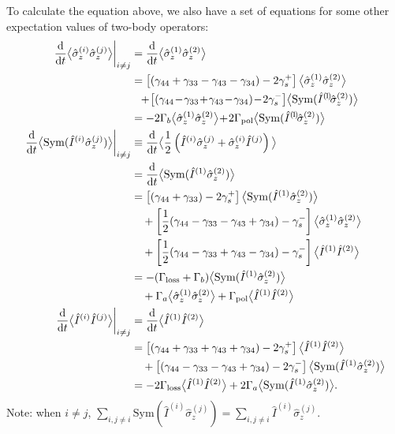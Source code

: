 To calculate the equation above, we also have a set of equations for some other expectation values of two-body operators:
\begin{align}
\left.\dt{}\expect{\hat{\sigma}_z^{(i)} \hat{\sigma}_z^{(j)}}\right|_{i\neq j} &= \dt{}\expect{\hat{\sigma}_z^{(1)} \hat{\sigma}_z^{(2)}}\\
&= \left[ (\gamma_{44}+\gamma_{33}-\gamma_{43}-\gamma_{34})  -2\gamma_s^+\right]\expect{\hat{\sigma}_z^{(1)} \hat{\sigma}_z^{(2)}}\nonumber\\
&\quad \!\!+\! \left[ (\gamma_{44}\!-\!\gamma_{33}\!+\!\gamma_{43}\!-\!\gamma_{34})  \!-\! 2\gamma_s^-\right]\! \expect{\mathrm{Sym}(\hat{I}^{(\!1\!)}\!\hat{\sigma}_z^{(2)} )}\\
&=-2\Gamma_b \expect{\hat{\sigma}_z^{(1)} \hat{\sigma}_z^{(2)}} \!+\! 2\Gamma_{\rm pol} \expect{\mathrm{Sym}(\hat{I}^{(\!1\!)}\!\hat{\sigma}_z^{(2)} )}\\
\left.\dt{}\expect{\mathrm{Sym}(\hat{I}^{(i)}\hat{\sigma}_z^{(j)} ) }\right|_{i\neq j} &\equiv \dt{}\expect{\frac{1}{2}\left( \hat{I}^{(i)}\hat{\sigma}_z^{(j)}+\hat{\sigma}_z^{(i)}\hat{I}^{(j)} \right) }\\
&= \dt{}\expect{\mathrm{Sym}( \hat{I}^{(1)}\hat{\sigma}_z^{(2)} ) }\\
&= \left[(\gamma_{44}+\gamma_{33})-2\gamma_s^+ \right] \expect{\mathrm{Sym}( \hat{I}^{(1)}\hat{\sigma}_z^{(2)} ) }\nonumber\\
&\quad + \left[ \frac{1}{2}(\gamma_{44}-\gamma_{33}-\gamma_{43}+\gamma_{34})  -\gamma_s^-\right]\expect{\hat{\sigma}_z^{(1)} \hat{\sigma}_z^{(2)}} \nonumber\\
&\quad + \left[ \frac{1}{2}(\gamma_{44}-\gamma_{33}+\gamma_{43}-\gamma_{34})  -\gamma_s^-\right]\expect{\hat{I}^{(1)} \hat{I}^{(2)}}\\
&= -(\Gamma_{\rm loss}+\Gamma_b )\expect{\mathrm{Sym}( \hat{I}^{(1)}\hat{\sigma}_z^{(2)} ) } \nonumber\\
&\quad +\Gamma_a \expect{\hat{\sigma}_z^{(1)} \hat{\sigma}_z^{(2)}} + \Gamma_{\rm pol}\expect{\hat{I}^{(1)} \hat{I}^{(2)}}\\
\left.\dt{}\expect{\hat{I}^{(i)} \hat{I}^{(j)}}\right|_{i\neq j} &= \dt{}\expect{\hat{I}^{(1)} \hat{I}^{(2)}}\\
&= \left[ (\gamma_{44}+\gamma_{33}+\gamma_{43}+\gamma_{34})  -2\gamma_s^+\right]\expect{\hat{I}^{(1)} \hat{I}^{(2)}}\nonumber\\
&\quad +\left[ (\gamma_{44}-\gamma_{33}-\gamma_{43}+\gamma_{34})  -2\gamma_s^-\right]\expect{\mathrm{Sym}(\hat{I}^{(1)} \hat{\sigma}_z^{(2)})} \nonumber\\
&= -2\Gamma_{\rm loss}\expect{\hat{I}^{(1)} \hat{I}^{(2)}}+2\Gamma_a \expect{\mathrm{Sym}(\hat{I}^{(1)} \hat{\sigma}_z^{(2)})}.
\end{align}
Note: when $ i\neq j $, $ \sum_{i,j\neq i}\mathrm{Sym}(\hat{I}^{(i)}\hat{\sigma}_z^{(j)} )= \sum_{i,j\neq i}\hat{I}^{(i)}\hat{\sigma}_z^{(j)}$.

